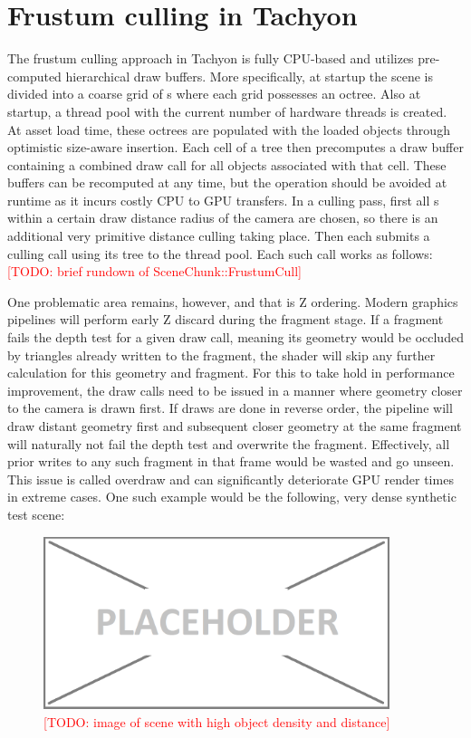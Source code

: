 \section{Frustum culling in Tachyon}
The frustum culling approach in Tachyon is fully CPU-based and utilizes pre-computed hierarchical draw buffers. More specifically, at startup the scene is divided into a coarse grid of s where each grid possesses an octree. Also at startup, a thread pool with the current number of hardware threads is created. At asset load time, these octrees are populated with the loaded objects through optimistic size-aware insertion. Each cell of a tree then precomputes a draw buffer containing a combined draw call for all objects associated with that cell. These buffers can be recomputed at any time, but the operation should be avoided at runtime as it incurs costly CPU to GPU transfers. 
In a culling pass, first all s within a certain draw distance radius of the camera are chosen, so there is an additional very primitive distance culling taking place. Then each  submits a culling call using its tree to the thread pool. Each such call works as follows: \\

\textcolor{red}{[TODO: brief rundown of SceneChunk::FrustumCull] \\}

One problematic area remains, however, and that is Z ordering. Modern graphics pipelines will perform early Z discard during the fragment stage. If a fragment fails the depth test for a given draw call, meaning its geometry would be occluded by triangles already written to the fragment, the shader will skip any further calculation for this geometry and fragment. For this to take hold in performance improvement, the draw calls need to be issued in a manner where geometry closer to the camera is drawn first. If draws are done in reverse order, the pipeline will draw distant geometry first and subsequent closer geometry at the same fragment will naturally not fail the depth test and overwrite the fragment. Effectively, all prior writes to any such fragment in that frame would be wasted and go unseen. This issue is called overdraw and can significantly deteriorate GPU render times in extreme cases. 
One such example would be the following, very dense synthetic test scene: 

\begin{figure}[htb]
  \centering
  \includegraphics[width=0.9\textwidth]{pictures/placeholder}
  \caption{\textcolor{red}{[TODO: image of scene with high object density and distance]}} \label{fig:blob}
\end{figure}

